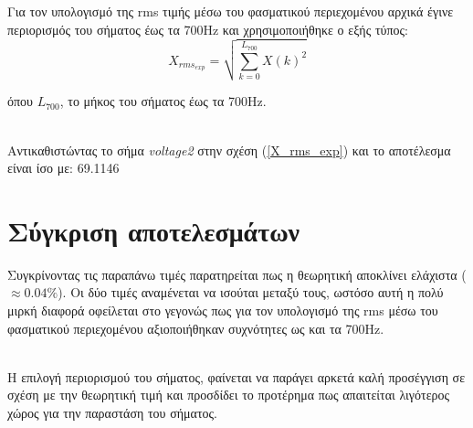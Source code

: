 Για τον υπολογισμό της rms τιμής μέσω του φασματικού περιεχομένου αρχικά έγινε περιορισμός του σήματος έως τα 700Hz και χρησιμοποιήθηκε ο εξής τύπος:
\begin{equation}
    X_{rms_{exp}} = \sqrt{\sum_{k=0}^{L_{700}} X(k)^2} \label{X_rms_exp}
\end{equation}

όπου $L_{700}$, το μήκος του σήματος έως τα 700Hz.

\noindent\\
Αντικαθιστώντας το σήμα \textit{voltage2} στην σχέση (\ref{X_rms_exp}) και το αποτέλεσμα είναι ίσο με: 69.1146

\section*{Σύγκριση αποτελεσμάτων}
\label{ex5q3}

Συγκρίνοντας τις παραπάνω τιμές παρατηρείται πως η θεωρητική αποκλίνει ελάχιστα ($\approx 0.04\%$). Οι δύο τιμές αναμένεται να ισούται μεταξύ τους, ωστόσο αυτή η πολύ μιρκή διαφορά οφείλεται στο γεγονώς πως για τον υπολογισμό της rms μέσω του φασματικού περιεχομένου αξιοποιήθηκαν συχνότητες ως και τα 700Hz.

\noindent\\
Η επιλογή περιορισμού του σήματος, φαίνεται να παράγει αρκετά καλή προσέγγιση σε σχέση με την θεωρητική τιμή και προσδίδει το προτέρημα πως απαιτείται λιγότερος χώρος για την παραστάση του σήματος.
